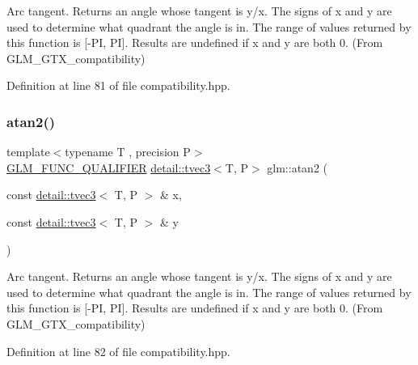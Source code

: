 Arc tangent. Returns an angle whose tangent is y/x. The signs of x and y are used to determine what quadrant the angle is in. The range of values returned by this function is \mbox{[}-\/\+PI, PI\mbox{]}. Results are undefined if x and y are both 0. (From G\+L\+M\+\_\+\+G\+T\+X\+\_\+compatibility) 



Definition at line 81 of file compatibility.\+hpp.

\mbox{\label{group__gtx__compatibility_gac457f8819be9cd8e3f42be17451b750a}} 
\subsubsection{\texorpdfstring{atan2()}{atan2()}\hspace{0.1cm}{\footnotesize\ttfamily [3/4]}}
{\footnotesize\ttfamily template$<$typename T , precision P$>$ \\
\hyperlink{setup_8hpp_a33fdea6f91c5f834105f7415e2a64407}{G\+L\+M\+\_\+\+F\+U\+N\+C\+\_\+\+Q\+U\+A\+L\+I\+F\+I\+ER} \hyperlink{structglm_1_1detail_1_1tvec3}{detail\+::tvec3}$<$T, P$>$ glm\+::atan2 (\begin{DoxyParamCaption}\item[{const \hyperlink{structglm_1_1detail_1_1tvec3}{detail\+::tvec3}$<$ T, P $>$ \&}]{x,  }\item[{const \hyperlink{structglm_1_1detail_1_1tvec3}{detail\+::tvec3}$<$ T, P $>$ \&}]{y }\end{DoxyParamCaption})}



Arc tangent. Returns an angle whose tangent is y/x. The signs of x and y are used to determine what quadrant the angle is in. The range of values returned by this function is \mbox{[}-\/\+PI, PI\mbox{]}. Results are undefined if x and y are both 0. (From G\+L\+M\+\_\+\+G\+T\+X\+\_\+compatibility) 



Definition at line 82 of file compatibility.\+hpp.

\mbox{\label{group__gtx__compatibility_ga3b9f0577d1b5d76c0f6ab04e28599fc4}} 
